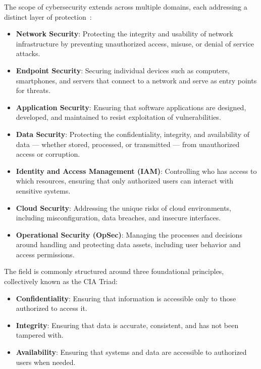 The scope of cybersecurity extends across multiple domains, each addressing a distinct layer of protection~\cite{kang2023zero,cynet2023basics}:
\begin{itemize}
    \item \textbf{Network Security}: Protecting the integrity and usability of network infrastructure by preventing unauthorized access, misuse, or denial of service attacks.
    \item \textbf{Endpoint Security}: Securing individual devices such as computers, smartphones, and servers that connect to a network and serve as entry points for threats.
    \item \textbf{Application Security}: Ensuring that software applications are designed, developed, and maintained to resist exploitation of vulnerabilities.
    \item \textbf{Data Security}: Protecting the confidentiality, integrity, and availability of data --- whether stored, processed, or transmitted --- from unauthorized access or corruption.
    \item \textbf{Identity and Access Management (IAM)}: Controlling who has access to which resources, ensuring that only authorized users can interact with sensitive systems.
    \item \textbf{Cloud Security}: Addressing the unique risks of cloud environments, including misconfiguration, data breaches, and insecure interfaces.
    \item \textbf{Operational Security (OpSec)}: Managing the processes and decisions around handling and protecting data assets, including user behavior and access permissions.
\end{itemize}


The field is commonly structured around three foundational principles, collectively known as the CIA Triad:
\begin{itemize}
    \item \textbf{Confidentiality}: Ensuring that information is accessible only to those authorized to access it.
    \item \textbf{Integrity}: Ensuring that data is accurate, consistent, and has not been tampered with.
    \item \textbf{Availability}: Ensuring that systems and data are accessible to authorized users when needed.
\end{itemize}

